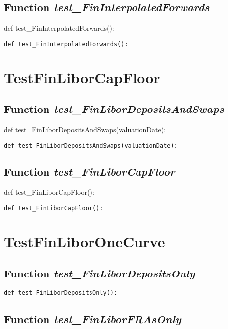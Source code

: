 \documentclass[twoside,11pt]{book}
\begin{document}
\subsection{Function {\it test\_FinInterpolatedForwards}}
def test\_FinInterpolatedForwards():

\begin{lstlisting}
def test_FinInterpolatedForwards():
\end{lstlisting}


\newpage
\section{TestFinLiborCapFloor}

\subsection{Function {\it test\_FinLiborDepositsAndSwaps}}
def test\_FinLiborDepositsAndSwaps(valuationDate):

\begin{lstlisting}
def test_FinLiborDepositsAndSwaps(valuationDate):
\end{lstlisting}

\subsection{Function {\it test\_FinLiborCapFloor}}
def test\_FinLiborCapFloor():

\begin{lstlisting}
def test_FinLiborCapFloor():
\end{lstlisting}


\newpage
\section{TestFinLiborOneCurve}

\subsection{Function {\it test\_FinLiborDepositsOnly}}


\begin{lstlisting}
def test_FinLiborDepositsOnly():
\end{lstlisting}

\subsection{Function {\it test\_FinLiborFRAsOnly}}
\end{document}
